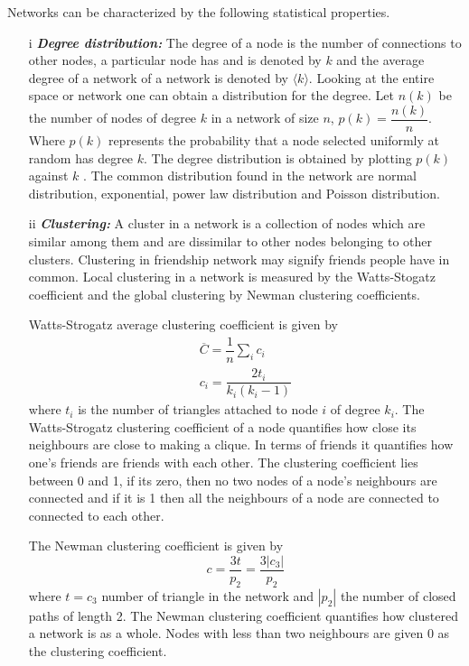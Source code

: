 Networks can be characterized by the following statistical properties.
 \begin{itemize}
 \item[i] \textit{\textbf{Degree distribution:}}
   The degree of a node is the number of connections to other nodes, a particular node has and is denoted by $k$ and the average degree of a network  of a network is denoted by $\langle k \rangle$. Looking at the entire space or network one can obtain a distribution for the degree. Let $n (k) $ be the number of nodes of degree $k$ in a network of size $n$, $p (k) = \dfrac{n(k)}{n}$. Where $p (k) $ represents the probability that a node selected uniformly at random has degree $k$. The degree distribution is obtained by plotting $p(k)$ against $k$ \citep{estrada2015first}. The common distribution found in the network are normal distribution, exponential, power law distribution and Poisson distribution\citep{chung2002average}.

 \item[ii] \textit{\textbf{Clustering: }}
   A cluster in a network  is a collection of nodes which are similar among them and are dissimilar to other nodes belonging to other clusters. Clustering in friendship network may signify friends people have in common. Local clustering in a network is measured by  the Watts-Stogatz coefficient and the global clustering by  Newman clustering coefficients.
 
 Watts-Strogatz average clustering coefficient is given by 
 \begin{align}
 \overline{C} = \dfrac{1}{n} \sum_i c_i
  \\ c_i = \dfrac{2t_i}{k_i(k_i-1)} \nonumber
  \end{align}
   where $t_i $ is the number of triangles attached to node $i$ of degree $k_i$. The Watts-Strogatz clustering coefficient of a node quantifies how close its neighbours are close to making a clique. In terms of friends it quantifies how one's friends are friends with each other. The clustering coefficient lies between 0 and 1, if its zero, then no two nodes of a node's neighbours are connected and if it is 1 then all the neighbours of a node are connected to connected to each other.
  

 The Newman clustering coefficient is given by
 \begin{equation}
 c = \frac{3t}{p_2} =\dfrac{3|c_3|}{p_2}
 \end{equation}
 where $t = c_3$ number of triangle in the network and $|p_2|$ the number of closed paths of length 2. 
 The Newman clustering coefficient quantifies how clustered a network is as a whole. Nodes with less than two neighbours are given 0 as the clustering coefficient. 
\end{itemize}

